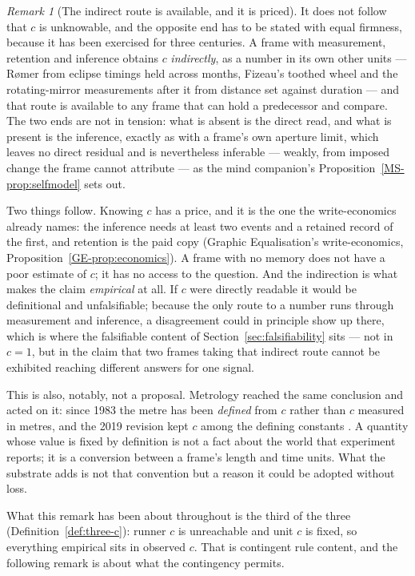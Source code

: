 \documentclass[11pt,a4paper]{article}
\theoremstyle{remark}\newtheorem{remark}[definition]{Remark}
\begin{document}
\begin{remark}[The indirect route is available, and it is priced]\label{rem:c-inferred}
It does not follow that $c$ is unknowable, and the opposite end has to be stated with equal
firmness, because it has been exercised for three centuries. A frame with measurement, retention and
inference obtains $c$ \emph{indirectly}, as a number in its own other units --- Rømer from eclipse
timings held across months, Fizeau's toothed wheel and the rotating-mirror
measurements after it from distance set against duration ---
and that route is available to any frame that can hold a predecessor and compare. The two ends are
not in tension: what is absent is the direct read, and what is present is the inference, exactly as
with a frame's own aperture limit, which leaves no direct residual and is nevertheless inferable ---
weakly, from imposed change the frame cannot attribute --- as the mind companion's
Proposition~\ref{MS-prop:selfmodel} sets out.

Two things follow. Knowing $c$ has a price, and it is the one the write-economics already names: the
inference needs at least two events and a retained record of the first, and retention is the paid
copy (Graphic Equalisation's write-economics, Proposition~\ref{GE-prop:economics}). A frame with no
memory does not have a
poor estimate of $c$; it has no access to the question. And the indirection is what makes the claim
\emph{empirical} at all. If $c$ were directly readable it would be definitional and unfalsifiable;
because the only route to a number runs through measurement and inference, a disagreement could in
principle show up there, which is where the falsifiable content of Section~\ref{sec:falsifiability}
sits --- not in $c=1$, but in the claim that two frames taking that indirect route cannot be
exhibited reaching different answers for one signal.

This is also, notably, not a proposal. Metrology reached the same conclusion and acted on it: since
1983 the metre has been \emph{defined} from $c$ rather than $c$ measured in metres, and the 2019
revision kept $c$ among the defining constants \citep{bipm2019}. A quantity whose value is fixed by
definition is not a fact about the world that experiment reports; it is a conversion between a
frame's length and time units. What the substrate adds is not that convention but a reason it could
be adopted without loss.

What this remark has been about throughout is the third of the three
(Definition~\ref{def:three-c}): runner $c$ is unreachable and unit $c$ is fixed, so everything
empirical sits in observed $c$. That is contingent rule content, and the following remark is about
what the contingency permits.
\end{remark}
\end{document}
